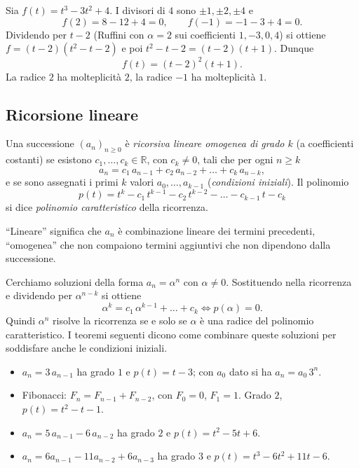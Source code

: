 \documentclass[11pt,a4paper]{article}
\begin{document}
\begin{esempio}
Sia $f(t) = t^3 - 3t^2 + 4$. I divisori di $4$ sono $\pm 1, \pm 2, \pm 4$ e
\[
  f(2) = 8 - 12 + 4 = 0 , \qquad f(-1) = -1 - 3 + 4 = 0 .
\]
Dividendo per $t - 2$ (Ruffini con $\alpha = 2$ sui coefficienti
$1, -3, 0, 4$) si ottiene $f = (t - 2)(t^2 - t - 2)$ e poi
$t^2 - t - 2 = (t - 2)(t + 1)$. Dunque
\[
  f(t) = (t - 2)^2 (t + 1) .
\]
La radice $2$ ha molteplicità $2$, la radice $-1$ ha molteplicità $1$.
\end{esempio}

\subsection{Ricorsione lineare}

\begin{definizione}
Una successione $(a_n)_{n \geq 0}$ è \emph{ricorsiva lineare omogenea di grado
$k$} (a coefficienti costanti) se esistono $c_1, \dots, c_k \in \mathbb{R}$,
con $c_k \neq 0$, tali che per ogni $n \geq k$
\[
  a_n = c_1\, a_{n-1} + c_2\, a_{n-2} + \dots + c_k\, a_{n-k} ,
\]
e se sono assegnati i primi $k$ valori $a_0, \dots, a_{k-1}$ (\emph{condizioni
iniziali}). Il polinomio
\[
  p(t) = t^k - c_1\, t^{k-1} - c_2\, t^{k-2} - \dots - c_{k-1}\, t - c_k
\]
si dice \emph{polinomio caratteristico} della ricorrenza.
\end{definizione}

``Lineare'' significa che $a_n$ è combinazione lineare dei termini precedenti,
``omogenea'' che non compaiono termini aggiuntivi che non dipendono dalla
successione.

\begin{osservazione}
Cerchiamo soluzioni della forma $a_n = \alpha^n$ con $\alpha \neq 0$.
Sostituendo nella ricorrenza e dividendo per $\alpha^{n-k}$ si ottiene
\[
  \alpha^k = c_1\, \alpha^{k-1} + \dots + c_k
  \iff p(\alpha) = 0 .
\]
Quindi $\alpha^n$ risolve la ricorrenza se e solo se $\alpha$ è una radice del
polinomio caratteristico. I teoremi seguenti dicono come combinare queste
soluzioni per soddisfare anche le condizioni iniziali.
\end{osservazione}

\begin{esempio}
\begin{itemize}
  \item $a_n = 3\, a_{n-1}$ ha grado $1$ e $p(t) = t - 3$; con $a_0$ dato si ha
        $a_n = a_0\, 3^n$.
  \item Fibonacci: $F_n = F_{n-1} + F_{n-2}$, con $F_0 = 0$, $F_1 = 1$. Grado
        $2$, $p(t) = t^2 - t - 1$.
  \item $a_n = 5\, a_{n-1} - 6\, a_{n-2}$ ha grado $2$ e
        $p(t) = t^2 - 5t + 6$.
  \item $a_n = 6 a_{n-1} - 11 a_{n-2} + 6 a_{n-3}$ ha grado $3$ e
        $p(t) = t^3 - 6t^2 + 11t - 6$.
\end{itemize}
\end{esempio}
\end{document}
